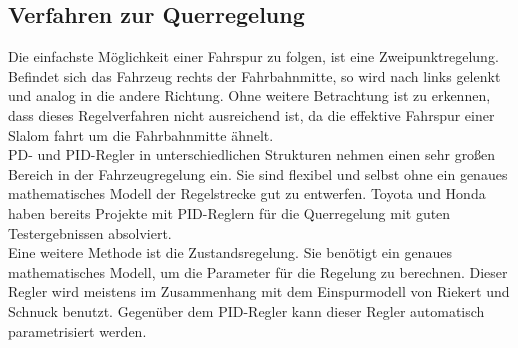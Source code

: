 \subsection*{Verfahren zur Querregelung}
Die einfachste Möglichkeit einer Fahrspur zu folgen, ist eine Zweipunktregelung. Befindet sich das Fahrzeug rechts der Fahrbahnmitte, so wird nach links gelenkt und analog in die andere Richtung. Ohne weitere Betrachtung ist zu erkennen, dass dieses Regelverfahren nicht ausreichend ist, da die effektive Fahrspur einer Slalom fahrt um die Fahrbahnmitte ähnelt.\\
PD- und PID-Regler in unterschiedlichen Strukturen nehmen einen sehr großen Be\-reich in der Fahrzeugregelung ein. Sie sind flexibel und selbst ohne ein genaues mathe\-matisches Modell der Regelstrecke gut zu entwerfen. Toyota und Honda haben bereits Projekte mit PID-Reglern für die Querregelung mit guten Testergebnissen absolviert. \\
Eine weitere Methode ist die Zustandsregelung. Sie benötigt ein genaues mathematisches Modell, um die Parameter für die Regelung zu berechnen. Dieser Regler wird meistens im Zusammenhang mit dem Einspurmodell von Riekert und Schnuck benutzt. Gegenüber dem PID-Regler kann dieser Regler automatisch parametrisiert werden.\cite{FaDyRe}\cite{MAQuer}\\


